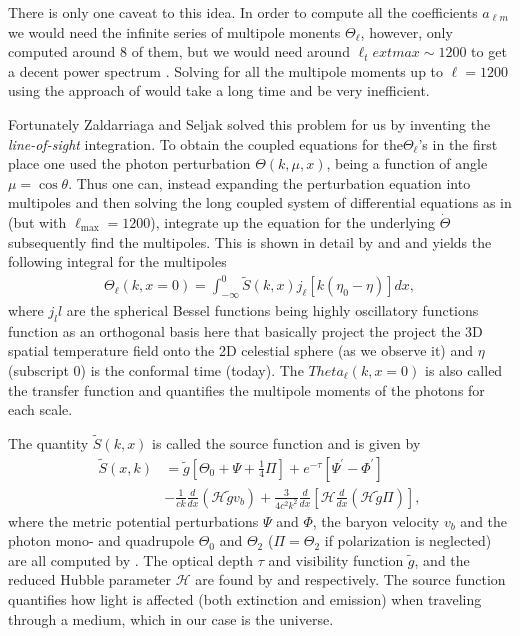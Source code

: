 \documentclass[twocolumn]{aastex62}
\begin{document}
There is only one caveat to this idea. In order to compute all the coefficients $a_{\ell m}$ we would need the infinite series of multipole monents $\Theta_\ell$, however, \cite{stutzer:2020c} only computed around 8 of them, but we would need around $\ell_text{max} \sim 1200$ to get a decent power spectrum \citep[]{winther:2020c}. Solving for all the multipole moments up to $\ell = 1200$ using the approach of \cite{stutzer:2020c} would take a long time and be very inefficient. 

Fortunately Zaldarriaga and Seljak solved this problem for us by inventing the \textit{line-of-sight} integration. To obtain the coupled equations for the$ \Theta_\ell$'s in the first place one used the photon perturbation $\Theta(k, \mu, x)$, being a function of angle $\mu = \cos \theta$. Thus one can, instead expanding the perturbation equation into multipoles and then solving the long coupled system of differential equations as in \cite{stutzer:2020c} (but with $\ell_\text{max} = 1200$), integrate up the equation for the underlying $\dot{\Theta}$ subsequently find the multipoles. This is shown in detail by \cite{callin:2006} and \cite{dodelson:2003} and yields the following integral for the multipoles 
\begin{align}
    \Theta_\ell(k, x=0) = \int_{-\infty}^{0} \tilde{S}(k,x)
              j_\ell[k(\eta_0-\eta)] dx,
    \label{eq:transfer}
\end{align} 
where $j_ll$ are the spherical Bessel functions being highly oscillatory functions function as an orthogonal basis here that basically project the project the 3D spatial temperature field onto the 2D celestial sphere (as we observe it) and $\eta$ (subscript 0) is the conformal time (today). The $Theta_\ell(k, x = 0)$ is also called the transfer function and quantifies the multipole moments of the photons for each scale.

The quantity $\tilde{S}(k,x)$ is called the source function and is given by
\begin{align}
    \tilde{S}(x, k) &= \tilde{g}\left[ \Theta_0 + \Psi + \frac{1}{4}\Pi\right] + e^{-\tau} \left[\Psi^\prime-\Phi^\prime\right] \nonumber\\
    &- \frac{1}{ck}\frac{d}{dx}(\mathcal{H}\tilde{g}v_b) + \frac{3}{4c^2k^2} \frac{d}{dx} \left[\mathcal{H}\frac{d}{dx} (\mathcal{H}\tilde{g}\Pi)\right],
    \label{eq:source}
\end{align}
where the metric potential perturbations $\Psi$ and $\Phi$, the baryon velocity $v_b$ and the photon mono- and quadrupole $\Theta_0$ and $\Theta_2$ ($\Pi = \Theta_2$ if polarization is neglected) are all computed by \cite{stutzer:2020c}. The optical depth $\tau$ and visibility function $\tilde{g}$, and the reduced Hubble parameter $\mathcal{H}$ are found by \cite{stutzer:2020b} and \cite{stutzer:2020a} respectively. The source function quantifies how light is affected (both extinction and emission) when traveling through a medium, which in our case is the universe.
\end{document}
